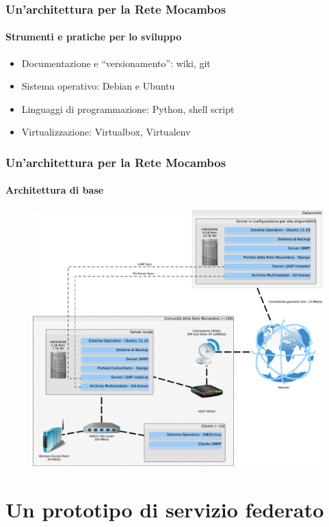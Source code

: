 \documentclass{beamer}
\begin{document}
{\begin{frame}
\end{frame}

\begin{frame}
  \frametitle{Un'architettura per la Rete Mocambos}
  \framesubtitle{Strumenti e pratiche per lo sviluppo}
  \begin{itemize}
    \item Documentazione e ``versionamento'': wiki, git
    \item Sistema operativo: Debian e Ubuntu
    \item Linguaggi di programmazione: Python, shell script
    \item Virtualizzazione: Virtualbox, Virtualenv
    \end{itemize}

\end{frame}

\begin{frame}
  \frametitle{Un'architettura per la Rete Mocambos}
  \framesubtitle{Architettura di base}
	\begin{figure}
		\includegraphics[height=0.7\textheight]{./Figuras/SchemaServer_ReteMocambos-crop.pdf}
	\end{figure}
\end{frame}

\section{Un prototipo di servizio federato}

}
\end{document}
